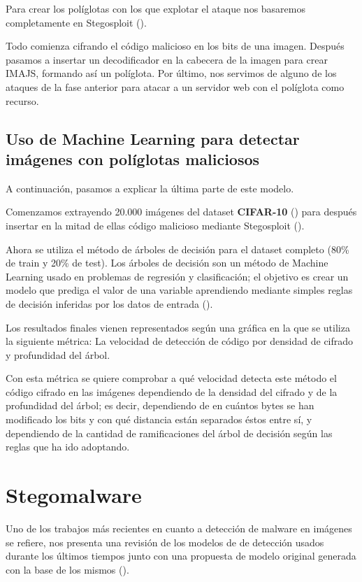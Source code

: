 Para crear los políglotas con los que explotar el ataque nos basaremos completamente en Stegosploit (\cite{stegosploit}).

Todo comienza cifrando el código malicioso en los bits de una imagen. Después pasamos a insertar un decodificador en la cabecera de la imagen para crear IMAJS, formando así un políglota. Por último, nos servimos de alguno de los ataques de la fase anterior para atacar a un servidor web con el políglota como recurso.

\subsection{Uso de Machine Learning para detectar imágenes con políglotas maliciosos}

A continuación, pasamos a explicar la última parte de este modelo.

Comenzamos extrayendo 20.000 imágenes del dataset \textbf{CIFAR-10} (\cite{cifar10}) para después insertar en la mitad de ellas código malicioso mediante Stegosploit (\cite{stegosploit}). %

Ahora se utiliza el método de árboles de decisión para el dataset completo (80\% de train y 20\% de test). Los árboles de decisión son un método de Machine Learning usado en problemas de regresión y clasificación; el objetivo es crear un modelo que prediga el valor de una variable aprendiendo mediante simples reglas de decisión inferidas por los datos de entrada (\cite{decision-trees}). %

Los resultados finales vienen representados según una gráfica en la que se utiliza la siguiente métrica: La velocidad de detección de código por densidad de cifrado y profundidad del árbol.

Con esta métrica se quiere comprobar a qué velocidad detecta este método el código cifrado en las imágenes dependiendo de la densidad del cifrado y de la profundidad del árbol; es decir, dependiendo de en cuántos bytes se han modificado los bits y con qué distancia están separados éstos entre sí, y dependiendo de la cantidad de ramificaciones del árbol de decisión según las reglas que ha ido adoptando.

\section{Stegomalware}

Uno de los trabajos más recientes en cuanto a detección de malware en imágenes se refiere, nos presenta una revisión de los modelos de de detección usados durante los últimos tiempos junto con una propuesta de modelo original generada con la base de los mismos (\cite{stegomalware}). %

